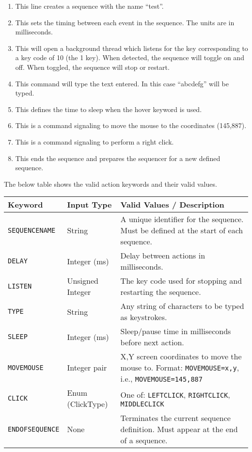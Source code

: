 \begin{enumerate}
	\item {} This line creates a sequence with the name ``test''.
	\item {} This sets the timing between each event in the sequence. The units are in milliseconds.
	\item {} This will open a background thread which listens for the key corresponding to a key code of 10 (the 1 key). When detected, the sequence will toggle on and off. When toggled, the sequence will stop or restart. 
	\item {} This command will type the text entered. In this case ``abcdefg'' will be typed.
	\item {} This defines the time to sleep when the hover keyword is used.
	\item {} This is a command signaling to move the mouse to the coordinates (145,887).
	\item {} This is a command signaling to perform a right click.
	\item {} This ends the sequence and prepares the sequencer for a new defined sequence.
\end{enumerate}

The below table shows the valid action keywords and their valid values.

\begin{table}[h]
	\centering
	\label{tab:sequencer_keywords}
	\begin{tabularx}{\textwidth}{|l|l|X|}
		\hline
		\textbf{Keyword} & \textbf{Input Type} & \textbf{Valid Values / Description} \\
		\hline
		\texttt{SEQUENCENAME} & String & A unique identifier for the sequence. Must be defined at the start of each sequence. \\
		\hline
		\texttt{DELAY} & Integer (ms) & Delay between actions in milliseconds.  \\
		\hline
		\texttt{LISTEN} & Unsigned Integer & The key code used for stopping and restarting the sequence.  \\
		\hline
		\texttt{TYPE} & String & Any string of characters to be typed as keystrokes. \\
		\hline
		\texttt{SLEEP} & Integer (ms) & Sleep/pause time in milliseconds before next action. \\
		\hline
		\texttt{MOVEMOUSE} & Integer pair & X,Y screen coordinates to move the mouse to. Format: \texttt{MOVEMOUSE=x,y}, i.e., \texttt{MOVEMOUSE=145,887} \\
		\hline
		\texttt{CLICK} & Enum (ClickType) & One of: \texttt{LEFTCLICK}, \texttt{RIGHTCLICK}, \texttt{MIDDLECLICK} \\
		\hline
		\texttt{ENDOFSEQUENCE} & None & Terminates the current sequence definition. Must appear at the end of a sequence. \\
		\hline
	\end{tabularx}
\end{table}


